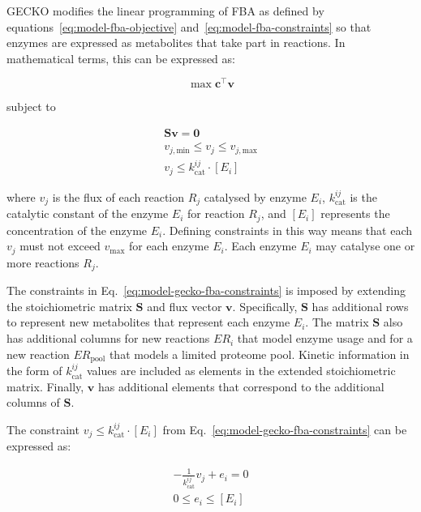 GECKO modifies the linear programming of FBA as defined by equations~\ref{eq:model-fba-objective} and~\ref{eq:model-fba-constraints} so that enzymes are expressed as metabolites that take part in reactions.
In mathematical terms, this can be expressed as:

\begin{equation}
  \max \mathbf{c}^{\intercal} \mathbf{v}
  \label{eq:model-gecko-fba-objective}
\end{equation}

subject to

\begin{equation}
  \begin{gathered}
    \mathbf{S} \mathbf{v} = \mathbf{0}\\
    v_{j,\mathrm{min}} \leq v_{j} \leq v_{j,\mathrm{max}}\\
    v_{j} \leq k_{\mathrm{cat}}^{ij} \cdot [E_{i}]
  \end{gathered}
  \label{eq:model-gecko-fba-constraints}
\end{equation}

where $v_{j}$ is the flux of each reaction $R_{j}$ catalysed by enzyme $E_{i}$, $k_{\mathrm{cat}}^{ij}$ is the catalytic constant of the enzyme $E_{i}$ for reaction $R_{j}$, and $[E_{i}]$ represents the concentration of the enzyme $E_{i}$.
Defining constraints in this way means that each $v_{j}$ must not exceed $v_{\mathrm{max}}$ for each enzyme $E_{i}$.
Each enzyme $E_{i}$ may catalyse one or more reactions $R_{j}$.

The constraints in Eq.\ \ref{eq:model-gecko-fba-constraints} is imposed by extending the stoichiometric matrix $\mathbf{S}$ and flux vector $\mathbf{v}$.
Specifically, $\mathbf{S}$ has additional rows to represent new metabolites that represent each enzyme $E_{i}$.
The matrix $\mathbf{S}$ also has additional columns for new reactions $ER_{i}$ that model enzyme usage and for a new reaction $ER_{\mathrm{pool}}$ that models a limited proteome pool.
Kinetic information in the form of $k_{\mathrm{cat}}^{ij}$ values are included as elements in the extended stoichiometric matrix.
Finally, $\mathbf{v}$ has additional elements that correspond to the additional columns of $\mathbf{S}$.

The constraint $v_{j} \leq k_{\mathrm{cat}}^{ij} \cdot [E_{i}]$ from Eq.\ \ref{eq:model-gecko-fba-constraints} can be expressed as:

\begin{equation}
  \begin{gathered}
    -\frac{1}{k_{\mathrm{cat}}^{ij}}v_{j} + e_{i} = 0\\
    0 \leq e_{i} \leq [E_{i}]
  \end{gathered}
  \label{eq:model-gecko-fba-constraints-extended}
\end{equation}

